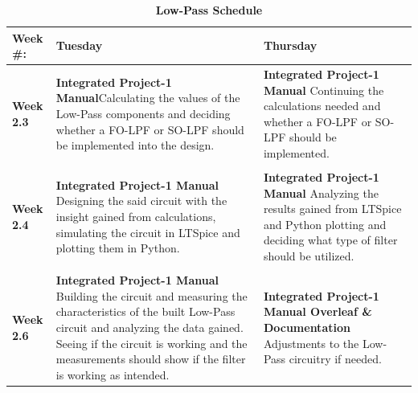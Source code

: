 \begin{table}[h!]
\centering
\captionsetup{justification=centering, labelfont=bf}
\caption{\textbf{Low-Pass Schedule}}
\begin{tabular*}{\textwidth}{@{\extracolsep{\fill}} p{} p{} p{} @{}} 
\toprule
     \textbf{Week \#:} & \textbf{Tuesday} & \textbf{Thursday} \\
     \midrule
     {\textbf{Week 2.3 }}&\textbf{Integrated Project-1 Manual}\newline Calculating the values of the Low-Pass components and deciding whether a FO-LPF or SO-LPF should be implemented into the design.& \textbf{Integrated Project-1 Manual} \newline Continuing the calculations needed and whether a FO-LPF or SO-LPF should be implemented.\\
     \vspace{10pt}\\
    {\textbf{Week 2.4}} & \textbf{Integrated Project-1 Manual} \newline Designing the said circuit with the insight gained from calculations, simulating the circuit in LTSpice and plotting them in Python. & \textbf{Integrated Project-1 Manual} \newline Analyzing the results gained from LTSpice and Python plotting and deciding what type of filter should be utilized. \\
     \vspace{10pt}\\
     {\textbf{Week 2.6}} & \textbf{Integrated Project-1 Manual} \newline Building the circuit and measuring the characteristics of the built Low-Pass circuit and analyzing the data gained. Seeing if the circuit is working and the measurements should show if the filter is working as intended. & \textbf{Integrated Project-1 Manual \newline Overleaf \& Documentation} \newline Adjustments to the Low-Pass circuitry if needed.  \\
     \bottomrule
\end{tabular*}

\label{tab:LowPass schedule}
\end{table}


